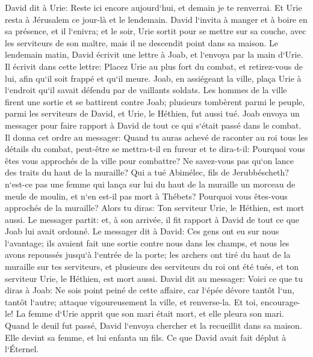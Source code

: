 \verse David dit à Urie: Reste ici encore aujourd`hui, et demain je te renverrai. Et Urie resta à Jérusalem ce jour-là et le lendemain. 
\verse David l`invita à manger et à boire en sa présence, et il l`enivra; et le soir, Urie sortit pour se mettre sur sa couche, avec les serviteurs de son maître, mais il ne descendit point dans sa maison. 
\verse Le lendemain matin, David écrivit une lettre à Joab, et l`envoya par la main d`Urie. 
\verse Il écrivit dans cette lettre: Placez Urie au plus fort du combat, et retirez-vous de lui, afin qu`il soit frappé et qu`il meure. 
\verse Joab, en assiégeant la ville, plaça Urie à l`endroit qu`il savait défendu par de vaillants soldats. 
\verse Les hommes de la ville firent une sortie et se battirent contre Joab; plusieurs tombèrent parmi le peuple, parmi les serviteurs de David, et Urie, le Héthien, fut aussi tué. 
\verse Joab envoya un messager pour faire rapport à David de tout ce qui s`était passé dans le combat. 
\verse Il donna cet ordre au messager: Quand tu auras achevé de raconter au roi tous les détails du combat, 
\verse peut-être se mettra-t-il en fureur et te dira-t-il: Pourquoi vous êtes vous approchés de la ville pour combattre? Ne savez-vous pas qu`on lance des traits du haut de la muraille? 
\verse Qui a tué Abimélec, fils de Jerubbéscheth? n`est-ce pas une femme qui lança sur lui du haut de la muraille un morceau de meule de moulin, et n`en est-il pas mort à Thébets? Pourquoi vous êtes-vous approchés de la muraille? Alors tu diras: Ton serviteur Urie, le Héthien, est mort aussi. 
\verse Le messager partit: et, à son arrivée, il fit rapport à David de tout ce que Joab lui avait ordonné. 
\verse Le messager dit à David: Ces gens ont eu sur nous l`avantage; ils avaient fait une sortie contre nous dans les champs, et nous les avons repoussés jusqu`à l`entrée de la porte; 
\verse les archers ont tiré du haut de la muraille sur tes serviteurs, et plusieurs des serviteurs du roi ont été tués, et ton serviteur Urie, le Héthien, est mort aussi. 
\verse David dit au messager: Voici ce que tu diras à Joab: Ne sois point peiné de cette affaire, car l`épée dévore tantôt l`un, tantôt l`autre; attaque vigoureusement la ville, et renverse-la. Et toi, encourage-le! 
\verse La femme d`Urie apprit que son mari était mort, et elle pleura son mari. 
\verse Quand le deuil fut passé, David l`envoya chercher et la recueillit dans sa maison. Elle devint sa femme, et lui enfanta un fils. Ce que David avait fait déplut à l`Éternel. 

